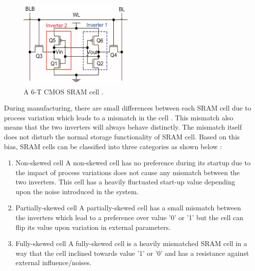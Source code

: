 \begin{figure}[tph!]
    \centerline{\includegraphics[width={0.5\textwidth}]{images/sram_cell}}
    \caption{A 6-T CMOS SRAM cell \cite{modeling_sram}.}
    \label{fig:sram_cell}
\end{figure}

During manufacturing, there are small differences between each SRAM cell due to process variation which leads to a mismatch in the cell \cite{dargar_2011}. This mismatch also means that the two inverters will always behave distinctly. The mismatch itself does not disturb the normal storage functionality of SRAM cell. Based on this bias, SRAM cells can be classified into three categories as shown below \cite{dargar_2011}:
\begin{enumerate}
\item Non-skewed cell\newline
A non-skewed cell has no preference during its startup due to the impact of process variations does not cause any mismatch between the two inverters. This cell has a heavily fluctuated start-up value depending upon the noise introduced in the system.
\item Partially-skewed cell\newline
A partially-skewed cell has a small mismatch between the inverters which lead to a preference over value '0' or '1' but the cell can flip its value upon variation in external parameters.
\item Fully-skewed cell\newline
A fully-skewed cell is a heavily mismatched SRAM cell in a way that the cell inclined towards value '1' or '0' and has a resistance against external influence/noises.
\end{enumerate}

